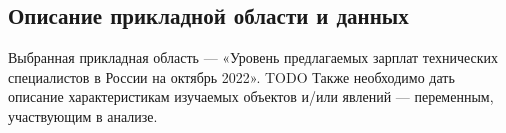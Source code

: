 \documentclass[12pt]{article}
\begin{document}
\subsection{Описание прикладной области и данных}
Выбранная прикладная область ---  «Уровень предлагаемых зарплат технических специалистов в России на октябрь 2022». TODO Также необходимо дать описание характеристикам изучаемых объектов и/или явлений --- переменным, участвующим в анализе.
\end{document}
